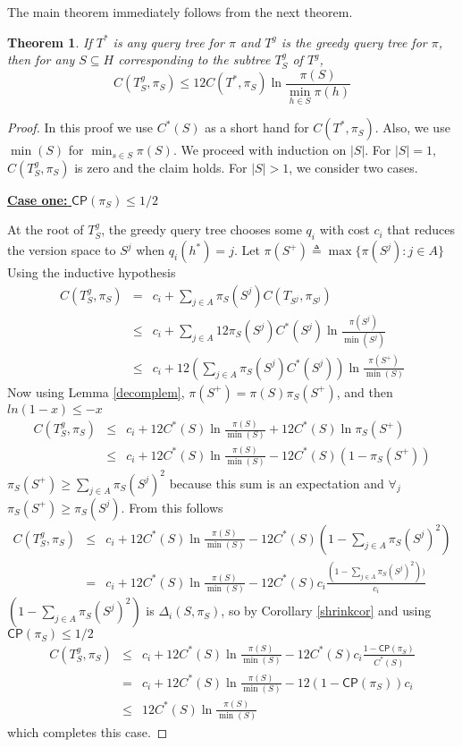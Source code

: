 \documentclass{article}
\newtheorem{theorem}{Theorem}
\begin{document}
The main theorem immediately follows from the next theorem.
\begin{theorem}If $T^*$ is any query tree for $\pi$ and $T^g$ is the
greedy query tree for $\pi$, then for any $S \subseteq H$
corresponding to the subtree $T^g_S$ of $T^g$,
\[ C(T^g_S, \pi_S) \leq 
12 C(T^*, \pi_S) \ln \frac{\pi(S)}{\min_{h \in S}\pi(h)} \]
\label{submainthm}
\end{theorem}
\begin{proof}
In this proof we use $C^*(S)$ as a short hand for $C(T^*,\pi_S)$.
Also, we use $\min(S)$ for $\min_{s \in S}\pi(S)$.  We proceed with
induction on $|S|$.  For $|S|=1$, $C(T^g_S, \pi_S)$ is zero and the
claim holds.  For $|S| > 1$, we consider two cases.

\noindent \underline{\textbf{Case one:} $\mathsf{CP}(\pi_S) \leq 1/2$}

At the root of $T^g_S$, the greedy query tree chooses some $q_i$
with cost $c_i$ that reduces the version space to $S^j$ when
$q_i(h^*)=j$.  Let 
$\pi(S^{+}) \triangleq \max \lbrace \pi(S^j) : j \in A \rbrace$
Using the inductive hypothesis
\begin{eqnarray*}
C(T^g_S, \pi_S) 
& = & c_i + \sum_{j \in A} \pi_S(S^j) C(T_{S^j}, \pi_{S^j}) \\
& \leq & c_i + \sum_{j \in A} 12 \pi_S(S^j) C^*(S^j)
\ln \frac{\pi(S^j)}{\min(S^j)} \\
& \leq & c_i + 12(\sum_{j \in A} \pi_S(S^j) C^*(S^j)) 
\ln \frac{\pi(S^{+})}{\min(S)} 
\end{eqnarray*}
Now using Lemma \ref{decomplem},
$\pi(S^{+})=\pi(S) \pi_S(S^+)$, and then $ln(1-x) \leq -x$
\begin{eqnarray*}
C(T^g_S, \pi_S)
& \leq & c_i + 12 C^*(S) \ln \frac{\pi(S)}{\min(S)} 
+ 12 C^*(S) \ln \pi_S(S^{+}) \\
& \leq & c_i + 12 C^*(S) \ln \frac{\pi(S)}{\min(S)} 
- 12 C^*(S) (1 - \pi_S(S^{+}))
\end{eqnarray*}
$\pi_S(S^+) \geq
\sum_{j \in A} \pi_S(S^j)^2$ because this sum is an expectation
and $\forall_j$ $\pi_S(S^+) \geq \pi_S(S^j)$.
From this follows
\begin{eqnarray*}
C(T^g_S, \pi_S)
& \leq  & c_i + 12 C^*(S) \ln \frac{\pi(S)}{\min(S)}
- 12 C^*(S) (1 - \sum_{j \in A}\pi_S(S^j)^2) \\
& = & c_i + 12 C^*(S) \ln \frac{\pi(S)}{\min(S)} 
 - 12 C^*(S) c_i \frac{(1 - \sum_{j \in A}\pi_S(S^j)^2))}{c_i} 
\end{eqnarray*}
$(1 - \sum_{j \in A}\pi_S(S^j)^2)$ is 
$\Delta_i(S, \pi_S)$, so by Corollary \ref{shrinkcor} and using
$\mathsf{CP}(\pi_S) \leq 1/2$
\begin{eqnarray*}
C(T^g_S, \pi_S)
& \leq  & c_i + 12 C^*(S) \ln \frac{\pi(S)}{\min(S)} 
 - 12 C^*(S) c_i \frac{1 - \mathsf{CP}(\pi_S)}{C^*(S)} \\
& = & c_i+12 C^*(S) \ln \frac{\pi(S)}{\min(S)} - 12(1 - \mathsf{CP}(\pi_S))c_i \\
& \leq & 12 C^*(S) \ln \frac{\pi(S)}{\min(S)}
\end{eqnarray*}
which completes this case.


\end{proof}
\end{document}
